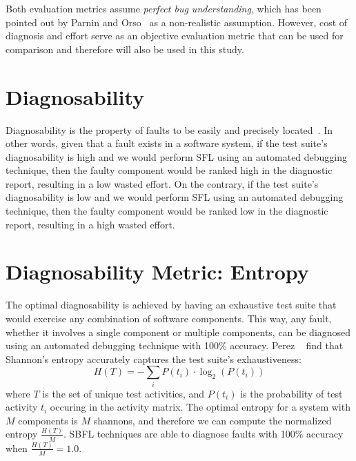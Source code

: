 \documentclass[twoside,a4paper,11pt]{memoir}
\begin{document}
Both evaluation metrics assume \emph{perfect bug understanding}, which has been pointed out by Parnin and Orso~\cite{Parnin:2011:ADT:2001420.2001445} as a non-realistic assumption.
However, cost of diagnosis and effort serve as an objective evaluation metric that can be used for comparison and therefore will also be used in this study.

\section{Diagnosability}
Diagnosability is the property of faults to be easily and precisely located~\cite{730889}.
In other words, given that a fault exists in a software system, if the test suite's diagnosability is high and we would perform SFL using an automated debugging technique, then the faulty component would be ranked high in the diagnostic report, resulting in a low wasted effort.
On the contrary, if the test suite's diagnosability is low and we would perform SFL using an automated debugging technique, then the faulty component would be ranked low in the diagnostic report, resulting in a high wasted effort.

\section{Diagnosability Metric: Entropy}
The optimal diagnosability is achieved by having an exhaustive test suite that would exercise any combination of software components.
This way, any fault, whether it involves a single component or multiple components, can be diagnosed using an automated debugging technique with 100\% accuracy.
Perez \etal~\cite{DBLP:conf/icse/PerezAD17} find that Shannon's entropy accurately captures the test suite's exhaustiveness:
\begin{equation}
  H(T) = - \sum_i P(t_i) \cdot \log_2(P(t_i))
\end{equation}
where \(T \) is the set of unique test activities, and \(P(t_i) \) is the probability of test activity \(t_i \) occuring in the activity matrix.
The optimal entropy for a system with \(M \) components is \(M \) shannons, and therefore we can compute the normalized entropy \(\frac{H(T)}{M} \).
SBFL techniques are able to diagnose faults with 100\% accuracy when \(\frac{H(T)}{M} = 1.0 \).
\end{document}
